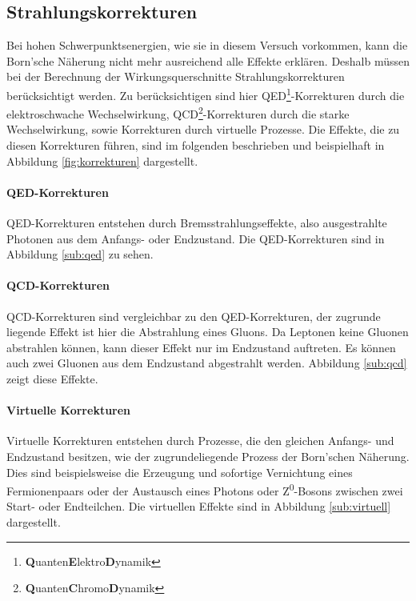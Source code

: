 \subsection{Strahlungskorrekturen}
Bei hohen Schwerpunktsenergien, wie sie in diesem Versuch vorkommen, kann die Born'sche Näherung nicht mehr ausreichend alle Effekte erklären. Deshalb müssen bei der Berechnung der Wirkungsquerschnitte Strahlungskorrekturen berücksichtigt werden. Zu berücksichtigen sind hier QED\footnote{\textbf Quanten\textbf Elektro\textbf Dynamik}-Korrekturen durch die elektroschwache Wechselwirkung, QCD\footnote{\textbf Quanten\textbf Chromo\textbf Dynamik}-Korrekturen durch die starke Wechselwirkung, sowie Korrekturen durch virtuelle Prozesse. Die Effekte, die zu diesen Korrekturen führen, sind im folgenden beschrieben und beispielhaft in Abbildung \ref{fig:korrekturen} dargestellt.

\paragraph{QED-Korrekturen}
QED-Korrekturen entstehen durch Bremsstrahlungseffekte, also ausgestrahlte Photonen aus dem Anfangs- oder Endzustand. Die QED-Korrekturen sind in Abbildung \ref{sub:qed} zu sehen.

\paragraph{QCD-Korrekturen}
QCD-Korrekturen sind vergleichbar zu den QED-Korrekturen, der zugrunde liegende Effekt ist hier die Abstrahlung eines Gluons. Da Leptonen keine Gluonen abstrahlen können, kann dieser Effekt nur im Endzustand auftreten. Es können auch zwei Gluonen aus dem Endzustand abgestrahlt werden. Abbildung \ref{sub:qcd} zeigt diese Effekte.

\paragraph{Virtuelle Korrekturen}
Virtuelle Korrekturen entstehen durch Prozesse, die den gleichen Anfangs- und Endzustand besitzen, wie der zugrundeliegende Prozess der Born'schen Näherung. Dies sind beispielsweise die Erzeugung und sofortige Vernichtung eines Fermionenpaars oder der Austausch eines Photons oder Z\textsuperscript0-Bosons zwischen zwei Start- oder Endteilchen. Die virtuellen Effekte sind in Abbildung \ref{sub:virtuell} dargestellt.

